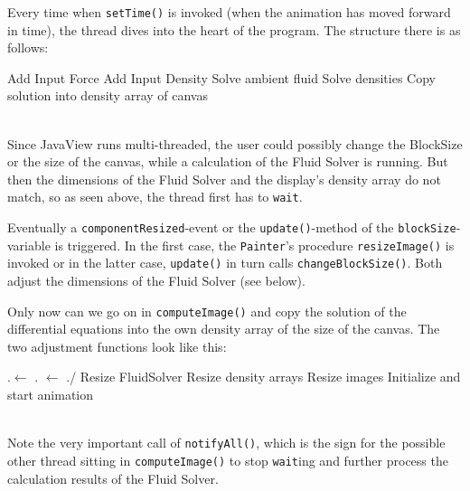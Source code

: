 \documentclass[a4paper,10pt,oneside,final,german,openbib,pdftex,titlepage]{scrbook}
\begin{document}
Every time when \texttt{setTime()} is invoked (when the animation has moved forward in time), the thread dives into the heart of the program. The structure there is as follows:\medskip\\
%
\begin{function}[H]
\DontPrintSemicolon
{}
\Fn{\setTime{}}
{
	\Fn{\cI{}}
	{
		Add Input Force\;
		Add Input Density\;
		\If{\isFrozen $==$ \false}
		{
			Solve ambient fluid\;
			Solve densities\;
		}
		\While{\incSize{}}{\wait{}\;}
		Copy solution into density array of canvas\;
		\cC{}\;
	}
}
\end{function}
\hfill\medskip\\
%
Since JavaView runs multi-threaded, the user could possibly change the BlockSize or the size of the canvas, while a calculation of the Fluid Solver is running. But then the dimensions of the Fluid Solver and the display's density array do not match, so as seen above, the thread first has to \texttt{wait}.

Eventually a \texttt{componentResized}-event or the \texttt{update()}-method of the \texttt{blockSize}-variable is triggered. In the first case, the \texttt{Painter}'s procedure \texttt{resizeImage()} is invoked or in the latter case, \texttt{update()} in turn calls \texttt{changeBlockSize()}. Both adjust the dimensions of the Fluid Solver (see below).

Only now can we go on in \texttt{computeImage()} and copy the solution of the differential equations into the own density array of the size of the canvas. The two adjustment functions look like this:\medskip\\
%
\begin{function}[H]
\DontPrintSemicolon
{}
\Fn{\rI{}}
{
	{
		\this.\size $\leftarrow$ \disp.\size\;
		\res $\leftarrow$ \this.\size /\bs\;
		Resize FluidSolver\;
		Resize density arrays\;
		Resize images\;
		Initialize and start animation\;
	}
	\nA{}\;
}
\end{function}
\hfill\medskip\\
%
Note the very important call of \texttt{notifyAll()}, which is the sign for the possible other thread sitting in \texttt{computeImage()} to stop \texttt{wait}ing and further process the calculation results of the Fluid Solver.
\end{document}
